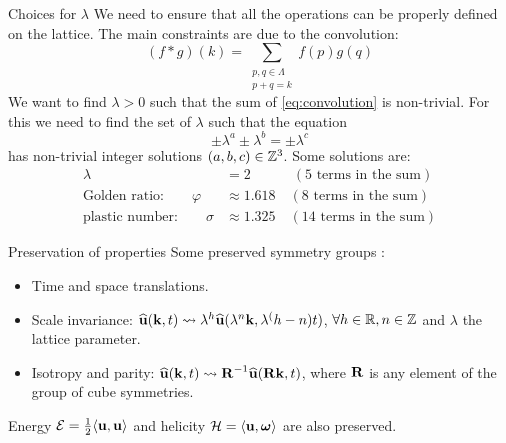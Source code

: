 \documentclass{beamer} %
\begin{document}
\begin{frame}{Choices for $\lambda$}
  We need to ensure that all the operations can be properly defined on the lattice. The main constraints are due to the convolution:
  \begin{equation}\label{eq:convolution}
    (f*g)(k) = \sum_{\substack{p,q\in \Lambda\\p+q=k}} f(p)g(q)
  \end{equation}
  We want to find $\lambda>0$ such that the sum of \eqref{eq:convolution} is non-trivial. For this we need to find the set of $\lambda$ such that the equation
  \begin{equation}
    \pm\lambda^a  \pm\lambda^b = \pm\lambda^c
  \end{equation}
  has non-trivial integer solutions $(a,b,c)\in\mathbb{Z}^3$.
  Some solutions are:
  \begin{align*}
    \lambda                            & = 2                    \qquad\quad\! (\text{5 terms in the sum}) \\
    \text{Golden ratio:}\qquad \varphi & \approx 1.618\quad (\text{8 terms in the sum})                   \\
    \text{plastic number:}\qquad\sigma & \approx 1.325\quad (\text{14 terms in the sum})
  \end{align*}
\end{frame}
\begin{frame}{Preservation of properties}
  Some preserved symmetry groups \cite{campolina}:
  \begin{itemize}
    \item Time and space translations.
    \item Scale invariance: $\widehat{\boldsymbol{\mathrm{u}}}(\boldsymbol{\mathrm{k}},t) \rightsquigarrow \lambda^h \widehat{\boldsymbol{\mathrm{u}}}(\lambda^n \boldsymbol{\mathrm{k}},\lambda^(h-n) t)$, $\forall h\in \mathbb{R}, n\in\mathbb{Z}$ and $\lambda$ the lattice parameter.
    \item Isotropy and parity: $\widehat{\boldsymbol{\mathrm{u}}}(\boldsymbol{\mathrm{k}},t) \rightsquigarrow \boldsymbol{\mathrm{R}}^{-1} \widehat{\boldsymbol{\mathrm{u}}}(\boldsymbol{\mathrm{R}}\boldsymbol{\mathrm{k}},t)$, where $\boldsymbol{\mathrm{R}}$ is any element of the group of cube symmetries.
  \end{itemize}
  Energy $\mathcal{E}=\frac{1}{2} \langle {\boldsymbol{\mathrm{u}}}, {\boldsymbol{\mathrm{u}}} \rangle$ and helicity $\mathcal{H}=\langle {\boldsymbol{\mathrm{u}}}, {\boldsymbol{\mathrm{\omega}}} \rangle$ are also preserved.

\end{frame}
\end{document}
